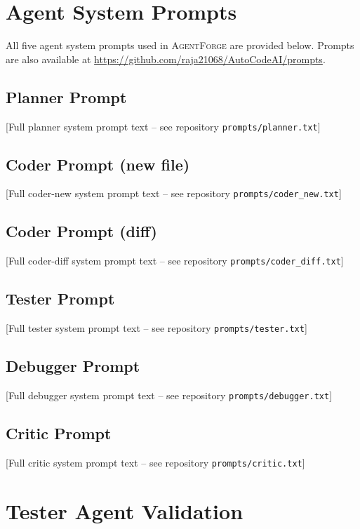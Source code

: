 \documentclass[journal]{IEEEtran}
\newcommand{\agentforge}{\textsc{AgentForge}}
\begin{document}
\section{Agent System Prompts}
\label{app:prompts}

All five agent system prompts used in \agentforge{} are provided below. Prompts are also available at \url{https://github.com/raja21068/AutoCodeAI/prompts}.

\subsection{Planner Prompt}
[Full planner system prompt text -- see repository \texttt{prompts/planner.txt}]

\subsection{Coder Prompt (new file)}
[Full coder-new system prompt text -- see repository \texttt{prompts/coder\_new.txt}]

\subsection{Coder Prompt (diff)}
[Full coder-diff system prompt text -- see repository \texttt{prompts/coder\_diff.txt}]

\subsection{Tester Prompt}
[Full tester system prompt text -- see repository \texttt{prompts/tester.txt}]

\subsection{Debugger Prompt}
[Full debugger system prompt text -- see repository \texttt{prompts/debugger.txt}]

\subsection{Critic Prompt}
[Full critic system prompt text -- see repository \texttt{prompts/critic.txt}]

\section{Tester Agent Validation}
\label{app:tester_validation}
\end{document}
